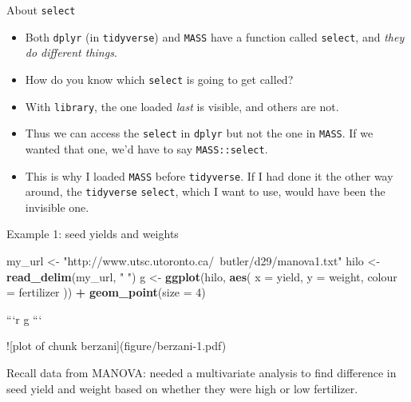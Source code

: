 \documentclass[ignorenonframetext,]{beamer}
\newenvironment{Shaded}{\begin{snugshade}}{\end{snugshade}}
\newcommand{\DataTypeTok}[1]{\textcolor[rgb]{0.13,0.29,0.53}{#1}}
\newcommand{\DecValTok}[1]{\textcolor[rgb]{0.00,0.00,0.81}{#1}}
\newcommand{\KeywordTok}[1]{\textcolor[rgb]{0.13,0.29,0.53}{\textbf{#1}}}
\newcommand{\NormalTok}[1]{#1}
\newcommand{\OperatorTok}[1]{\textcolor[rgb]{0.81,0.36,0.00}{\textbf{#1}}}
\newcommand{\StringTok}[1]{\textcolor[rgb]{0.31,0.60,0.02}{#1}}
\begin{document}
\begin{frame}[fragile]{About \texttt{select}}
\protect\hypertarget{about-select}{}

\begin{itemize}
\item
  Both \texttt{dplyr} (in \texttt{tidyverse}) and \texttt{MASS} have a
  function called \texttt{select}, and \emph{they do
  different things}.
\item
  How do you know which \texttt{select} is going to get called?
\item
  With \texttt{library}, the one loaded \emph{last} is visible, and
  others are not.
\item
  Thus we can access the \texttt{select} in \texttt{dplyr} but not the
  one in \texttt{MASS}. If we wanted that one, we'd have to say
  \texttt{MASS::select}.
\item
  This is why I loaded \texttt{MASS} before \texttt{tidyverse}. If I had
  done it the other way around, the \texttt{tidyverse} \texttt{select},
  which I want to use, would have been the invisible one.
\end{itemize}

\end{frame}

\begin{frame}[fragile]{Example 1: seed yields and weights}
\protect\hypertarget{example-1-seed-yields-and-weights}{}

\begin{Shaded}
\begin{Highlighting}[]
\NormalTok{my_url <-}\StringTok{ "http://www.utsc.utoronto.ca/~butler/d29/manova1.txt"}
\NormalTok{hilo <-}\StringTok{ }\KeywordTok{read_delim}\NormalTok{(my_url, }\StringTok{" "}\NormalTok{)}
\NormalTok{g <-}\StringTok{ }\KeywordTok{ggplot}\NormalTok{(hilo, }\KeywordTok{aes}\NormalTok{(}
  \DataTypeTok{x =}\NormalTok{ yield, }\DataTypeTok{y =}\NormalTok{ weight,}
  \DataTypeTok{colour =}\NormalTok{ fertilizer}
\NormalTok{)) }\OperatorTok{+}\StringTok{ }\KeywordTok{geom_point}\NormalTok{(}\DataTypeTok{size =} \DecValTok{4}\NormalTok{)}
\end{Highlighting}
\end{Shaded}

\begin{minipage}[t]{0.6\linewidth}

```r
g
```

![plot of chunk berzani](figure/berzani-1.pdf)

   
\end{minipage}
\begin{minipage}[t]{0.38\linewidth}
\vspace{0.1\textheight}
Recall data from MANOVA: needed a multivariate analysis to find
difference in seed yield and weight based on whether they were high
or low fertilizer.
\end{minipage}

\end{frame}
\end{document}
